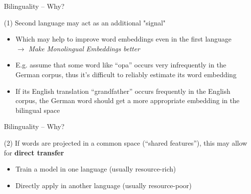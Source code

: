 \documentclass[12pt]{beamer}
\begin{document}
\begin{frame}{Bilinguality -- Why?}
	
(1) Second language may act as an additional "signal"

\begin{itemize}
	\item Which may help to improve word embeddings even in the first language \\
	$\to$ \emph{Make Monolingual Embeddings better}
	\item E.g. assume that some word like “opa” occurs very infrequently in the German corpus, thus it’s difficult to reliably estimate its word embedding
	\item If its English translation “grandfather” occurs frequently in the English corpus, the German word should get a more appropriate embedding in the bilingual space
\end{itemize}

\end{frame}


\begin{frame}{Bilinguality -- Why?}
	
(2) If words are projected in a common space (“shared features”), this may allow for \textbf{direct transfer} 

\begin{itemize}
	\item Train a model in one language (usually resource-rich)
	\item Directly apply in another language (usually resource-poor)
\end{itemize}

\end{frame}
\end{document}
